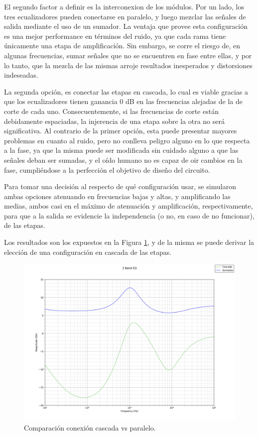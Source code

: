 El segundo factor a definir es la interconexion de los módulos.
Por un lado, los tres ecualizadores pueden conectarse en paralelo, y luego mezclar las señales de salida mediante el uso de un sumador.
La ventaja que provee esta configuración es una mejor performance en términos del ruido, ya que cada rama tiene únicamente una etapa de amplificación.
Sin embargo, se corre el riesgo de, en algunas frecuencias, sumar señales que no se encuentren en fase entre ellas, y por lo tanto, que la mezcla de las mismas arroje 
resultados inesperados y distorsiones indeseadas. \par
La segunda opción, es conectar las etapas en cascada, lo cual es viable gracias a que los ecualizadores tienen ganancia 0 dB en las frecuencias alejadas de la de corte de 
cada uno. Consecuentemente, si las frecuencias de corte están debidamente espaciadas, la injerencia de una etapa sobre la otra no será significativa.
Al contrario de la primer opción, esta puede presentar mayores problemas en cuanto al ruido, pero no conlleva peligro alguno en lo que respecta a la fase, ya que la misma 
puede ser modificada sin cuidado alguno a que las señales deban ser sumadas, y el oído humano no es capaz de oir cambios en la fase, cumpliéndose a la perfección el 
objetivo de diseño del circuito. \par
Para tomar una decisión al respecto de qué configuración usar, se simularon ambas opciones atenuando en frecuencias bajas y altas, y amplificando las medias, ambos casi en 
el máximo de atenuación y amplificación, respectivamente, para que a la salida se evidencie la independencia (o no, en caso de no funcionar), de las etapas. \par
Los resultados son los expuestos en la Figura \ref{fig:cascade_v_parallel_ex5}, y de la misma se puede derivar la elección de una configuración en cascada de las etapas.
\begin{figure}[H]
    \centering
    \includegraphics[width=\textwidth]{../EJ5/latex_resources/cascade_v_parallel_comparison}
    \caption{Comparación conexión cascada vs paralelo.}
    \label{fig:cascade_v_parallel_ex5}
\end{figure}

